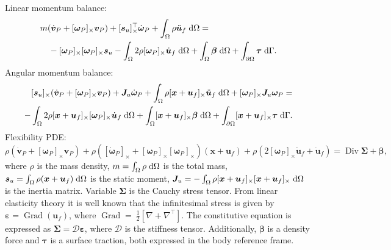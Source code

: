 \documentclass{svjour3}                     %
\DeclareMathOperator*{\Grad}{Grad}
\DeclareMathOperator*{\Div}{Div}
\newcommand{\crmat}[1]{\ensuremath{[#1]_{\times}}}
\begin{document}
Linear momentum balance:
\begin{equation}
\label{eq:rig_tr1}
\begin{split}
&m (\dot{\bm{v}}_P + \crmat{\bm{\omega}_P} \bm{v}_P) + \crmat{\bm{s}_u}^\top \dot{\bm{\omega}}_P  + \int_{\Omega} \rho \ddot{\bm{u}}_f \d{\Omega} = \\
&\quad - \crmat{\bm{\omega}_P} \crmat{\bm{\omega}_P} \bm{s}_u - \int_{\Omega} 2 \rho \crmat{\bm{\omega}_P} \dot{\bm{u}}_f \d{\Omega} +  \int_{\Omega} \bm\beta \d{\Omega} + \int_{\partial \Omega} \bm\tau \d{\Gamma}.
\end{split}
\end{equation}
Angular momentum balance:
\begin{equation}
\label{eq:rig_rot1}
\begin{split}
\crmat{\bm{s}_u} (\dot{\bm{v}}_P + \crmat{\bm{\omega}_P} \bm{v}_P) + \bm{J}_u \dot{\bm\omega}_P + \int_{\Omega} \rho \crmat{\bm{x}+\bm{u}_f} \ddot{\bm{u}}_f \d{\Omega} + \crmat{\bm{\omega}_P} \bm{J}_u \bm{\omega}_P = \\ 
- \int_{\Omega} 2\rho \crmat{\bm{x}+\bm{u}_f} \crmat{\bm\omega_P} \dot{\bm{u}}_f \d{\Omega} + \int_{\Omega}\crmat{\bm{x}+\bm{u}_f} \bm\beta \d{\Omega} + \int_{\partial \Omega}\crmat{\bm{x}+\bm{u}_f} \bm\tau \d{\Gamma}. \\
\end{split}
\end{equation}
Flexibility PDE:
\begin{equation}
\label{eq:flex1}
\rho (\dot{\bm{v}}_P + \crmat{\bm\omega_P} \bm{v}_P) + \rho (\crmat{\dot{\bm\omega}_P} + \crmat{\bm{\omega}_P}\crmat{\bm{\omega}_P})(\bm{x}+\bm{u}_f) + \rho (2 \crmat{\bm{\omega}_P} \dot{\bm{u}}_f + \ddot{\bm{u}}_f) = \Div{\bm\Sigma} + \bm\beta,
\end{equation}
where $\rho$ is the mass density, $m = \int_{\Omega} \rho \d{\Omega}$ is the total mass,  $\bm{s}_u = \int_{\Omega} \rho (\bm{x}+\bm{u}_f) \d{\Omega}$ is the static moment, $\bm{J}_u= - \int_{\Omega} \rho \crmat{\bm{x}+\bm{u}_f}\crmat{\bm{x}+\bm{u}_f} \d{\Omega}$ is the inertia matrix. Variable $\bm\Sigma$ is the Cauchy stress tensor. From linear elasticity theory it is well known that the infinitesimal stress is given by $\bm\varepsilon = \Grad(\bm{u}_f)$, where $\Grad=~\frac{1}{2} [\nabla + \nabla^\top]$. The constitutive equation is expressed as $\bm\Sigma =  \bm{\mathcal{D}} \bm\varepsilon$, where $ \bm{\mathcal{D}}$ is the stiffness tensor. Additionally, $\bm\beta$ is a density force and $\bm\tau$ is a surface traction, both expressed in the body reference frame. \\
\end{document}
